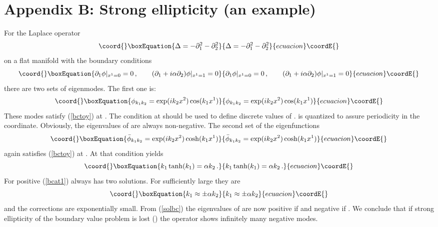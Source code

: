 \documentclass[a4paper,12pt]{article}
\begin{document}
\section*{Appendix B: Strong ellipticity (an example)}
For the Laplace operator
\begin{equation}\coord{}\boxEquation{
\Delta =-\partial_1^2 -\partial_2^2 
\label{Lap}
}{
\Delta =-\partial_1^2 -\partial_2^2 
}{ecuacion}\coordE{}\end{equation}
on a flat manifold \coordHE{}  
with the boundary conditions
\begin{equation}\coord{}\boxEquation{
\partial_1 \phi |_{x^1=0}=0 \,,\qquad
(\partial_1 +i\alpha \partial_2 )\phi |_{x^1=1}=0 
\label{bctoy}
}{
\partial_1 \phi |_{x^1=0}=0 \,,\qquad
(\partial_1 +i\alpha \partial_2 )\phi |_{x^1=1}=0 
}{ecuacion}\coordE{}\end{equation}
there are two sets of eigenmodes. 
The first one is:
\begin{equation}\coord{}\boxEquation{
\phi_{k_1k_2}=\exp (ik_2x^2) \cos (k_1x^1) 
\label{set1}
}{
\phi_{k_1k_2}=\exp (ik_2x^2) \cos (k_1x^1) 
}{ecuacion}\coordE{}\end{equation}
These modes satisfy (\ref{bctoy})
at \coordHE{}. The condition at \coordHE{} should be used
to define discrete values of \coordHE{}. \coordHE{} is quantized
to assure periodicity in the \coordHE{} coordinate. 
Obviously, the eigenvalues \coordHE{}
of \myHighlight{$\Delta$}\coordHE{} are  always non-negative.
The second set of the eigenfunctions 
\begin{equation}\coord{}\boxEquation{
\bar \phi_{k_1k_2}=\exp (ik_2x^2) \cosh (k_1x^1) 
\label{set2}
}{
\bar \phi_{k_1k_2}=\exp (ik_2x^2) \cosh (k_1x^1) 
}{ecuacion}\coordE{}\end{equation}
again satisfies  (\ref{bctoy})
at \coordHE{}. At \coordHE{} that condition  yields
\begin{equation}\coord{}\boxEquation{
k_1 \tanh (k_1)=\alpha k_2 \,. 
\label{bcat1}
}{
k_1 \tanh (k_1)=\alpha k_2 \,. 
}{ecuacion}\coordE{}\end{equation} 
For positive \coordHE{} (\ref{bcat1}) always has two 
solutions. For sufficiently large \coordHE{} they are
\begin{equation}\coord{}\boxEquation{
k_1 \approx \pm \alpha k_2 
\label{solbc}
}{
k_1 \approx \pm \alpha k_2 
}{ecuacion}\coordE{}\end{equation}
and the corrections are exponentially small. From 
(\ref{solbc}) the eigenvalues \coordHE{}
of  \myHighlight{$\Delta$}\coordHE{} are now positive
if \coordHE{} and negative if \coordHE{}. We conclude
that if strong ellipticity of the boundary value problem
is lost (\coordHE{}) the operator \myHighlight{$\Delta$}\coordHE{} shows infinitely
many negative modes.
\end{document}

